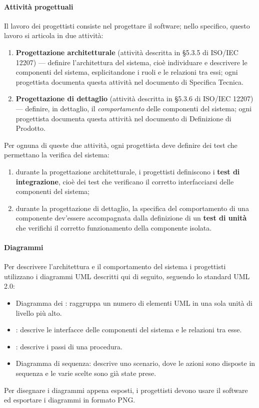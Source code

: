 	\paragraph{Attività progettuali} Il lavoro dei progettisti consiste nel progettare il software; nello specifico, questo lavoro si articola in due attività:
	\begin{enumerate}
		\item \textbf{Progettazione architetturale} (attività descritta in §5.3.5 di ISO/IEC 12207) --- definire l'architettura del sistema, cioè individuare e descrivere le componenti del sistema, esplicitandone i ruoli e le relazioni tra essi; ogni progettista documenta questa attività nel documento di Specifica Tecnica.
		\item \textbf{Progettazione di dettaglio} (attività descritta in §5.3.6 di ISO/IEC 12207) --- definire, in dettaglio, il \emph{comportamento} delle componenti del sistema; ogni progettista documenta questa attività nel documento di Definizione di Prodotto.
	\end{enumerate}
	Per ognuna di queste due attività, ogni progettista deve definire dei test che permettano la verifica del sistema:
	\begin{enumerate}
		\item durante la progettazione architetturale, i progettisti definiscono i \textbf{test di integrazione}, cioè dei test che verificano il corretto interfacciarsi delle componenti del sistema;
		\item durante la progettazione di dettaglio, la specifica del comportamento di una componente dev'essere accompagnata dalla definizione di un \textbf{test di unità} che verifichi il corretto funzionamento della componente isolata.
	\end{enumerate}

	\paragraph{Diagrammi} Per descrivere l'architettura e il comportamento del sistema i progettisti utilizzano i diagrammi UML descritti qui di seguito, seguendo lo standard UML 2.0:
	\begin{itemize}
		\item Diagramma dei : raggruppa un numero di elementi UML in una sola unità di livello più alto.
		\item {}: descrive le interfacce delle componenti del sistema e le relazioni tra esse.
		\item {}: descrive i passi di una procedura.
		\item Diagramma di sequenza: descrive uno scenario, dove le azioni sono disposte in sequenza e le varie scelte sono già state prese.
	\end{itemize}
	Per disegnare i diagrammi appena esposti, i progettisti devono usare il software  ed esportare i diagrammi in formato PNG.

